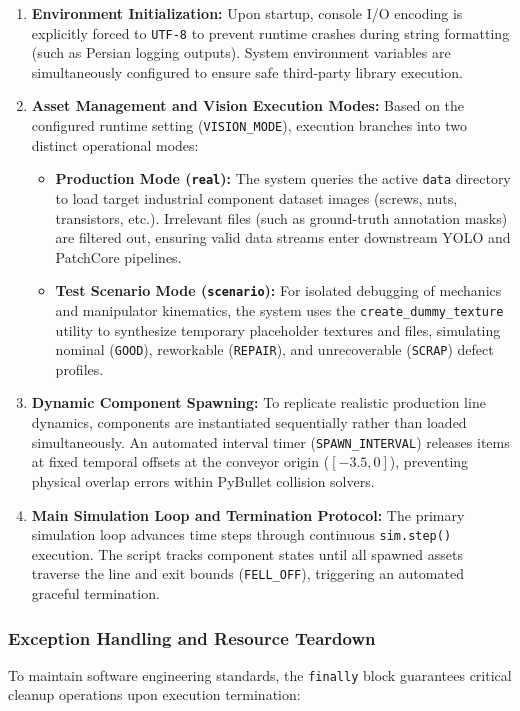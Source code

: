 \documentclass{article}
\begin{document}
\begin{enumerate}
	\item \textbf{Environment Initialization:}
	Upon startup, console I/O encoding is explicitly forced to \texttt{UTF-8} to prevent runtime crashes during string formatting (such as Persian logging outputs). System environment variables are simultaneously configured to ensure safe third-party library execution.
	
	\item \textbf{Asset Management and Vision Execution Modes:}
	Based on the configured runtime setting (\texttt{VISION\_MODE}), execution branches into two distinct operational modes:
	\begin{itemize}
		\item \textbf{Production Mode (\texttt{real}):} The system queries the active \texttt{data} directory to load target industrial component dataset images (screws, nuts, transistors, etc.). Irrelevant files (such as ground-truth annotation masks) are filtered out, ensuring valid data streams enter downstream YOLO and PatchCore pipelines.
		\item \textbf{Test Scenario Mode (\texttt{scenario}):} For isolated debugging of mechanics and manipulator kinematics, the system uses the \texttt{create\_dummy\_texture} utility to synthesize temporary placeholder textures and files, simulating nominal (\texttt{GOOD}), reworkable (\texttt{REPAIR}), and unrecoverable (\texttt{SCRAP}) defect profiles.
	\end{itemize}
	
	\item \textbf{Dynamic Component Spawning:}
	To replicate realistic production line dynamics, components are instantiated sequentially rather than loaded simultaneously. An automated interval timer (\texttt{SPAWN\_INTERVAL}) releases items at fixed temporal offsets at the conveyor origin ($[-3.5, 0]$), preventing physical overlap errors within PyBullet collision solvers.
	
	\item \textbf{Main Simulation Loop and Termination Protocol:}
	The primary simulation loop advances time steps through continuous \texttt{sim.step()} execution. The script tracks component states until all spawned assets traverse the line and exit bounds (\texttt{FELL\_OFF}), triggering an automated graceful termination.
\end{enumerate}

\subsubsection{Exception Handling and Resource Teardown}
To maintain software engineering standards, the \texttt{finally} block guarantees critical cleanup operations upon execution termination:
\end{document}

